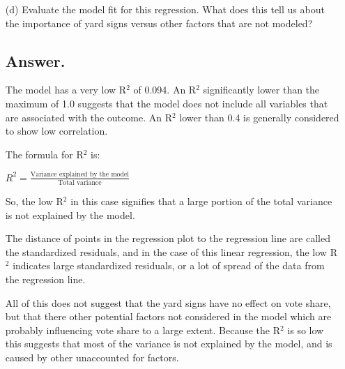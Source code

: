 \documentclass[12pt,letterpaper]{article}
\begin{document}
\begin{enumerate}
	\item [(d)] Evaluate the model fit for this regression.  What does this	tell us about the importance of yard signs versus other factors that are not modeled?
	\subsection*{Answer.}
	
	The model has a very low R$^2$ of 0.094. An R$^2$ significantly lower than the maximum of 1.0 suggests that the model does not include all variables that are associated with the outcome. An R$^2$ lower than 0.4 is generally considered to show low correlation.
	
	The formula for R$^2$ is:
	
	$R^2 = \frac{\text{Variance explained by the model}}{\text{Total variance}}$
	
	So, the low R$^2$ in this case signifies that a large portion of the total variance is not explained by the model.
	
	The distance of points in the regression plot to the regression line are called the standardized residuals, and in the case of this linear regression, the low R$^2$ indicates large standardized residuals, or a lot of spread of the data from the regression line.
	
	All of this does not suggest that the yard signs have no effect on vote share, but that there other potential factors not considered in the model which are probably influencing vote share to a large extent. Because the R$^2$ is so low this suggests that most of the variance is not explained by the model, and is caused by other unaccounted for factors.
	
	\vspace{2cm}
	

\end{enumerate}
\end{document}
